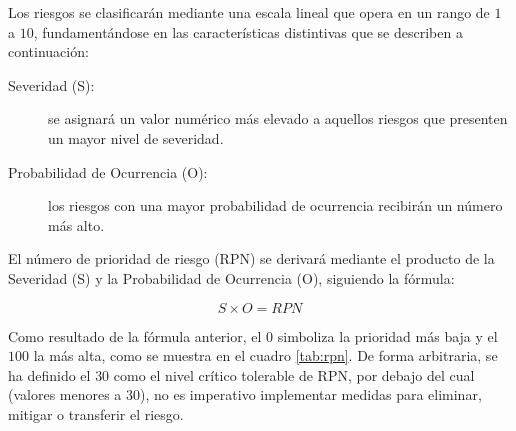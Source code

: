 

\newcommand{\colorcell}[1]{%
	\ifnum#1<10 \cellcolor{GreenColor}%
	\else\ifnum#1<20 \cellcolor{GreenColor!50}%
	\else\ifnum#1<30 \cellcolor{GreenColor!30}%
	\else\ifnum#1<40 \cellcolor{LightRed}%
	\else\ifnum#1<50 \cellcolor{RedColor!50}%
	\else\ifnum#1<60 \cellcolor{RedColor!60}%
	\else\ifnum#1<70 \cellcolor{RedColor!70}%
	\else\ifnum#1<80 \cellcolor{RedColor!80}%
	\else\ifnum#1<90 \cellcolor{RedColor!90}%
	\else \cellcolor{RedColor}%
	\fi\fi\fi\fi\fi\fi\fi\fi\fi
	#1%
}


Los riesgos se clasificarán mediante una escala lineal que opera en un rango de \(1\) a \(10\), fundamentándose en las características distintivas que se describen a continuación:

\begin{description}
	\item[Severidad (S):] se asignará un valor numérico más elevado a aquellos riesgos que presenten un mayor nivel de severidad.
	\item[Probabilidad de Ocurrencia (O):] los riesgos con una mayor probabilidad de ocurrencia recibirán un número más alto.
\end{description}

El número de prioridad de riesgo (RPN) se derivará mediante el producto de la Severidad (S) y la Probabilidad de Ocurrencia (O), siguiendo la fórmula:

\[ S \times O = RPN \]

Como resultado de la fórmula anterior, el \(0\) simboliza la prioridad más baja y el \(100\) la más alta, como se muestra en el cuadro \ref{tab:rpn}. De forma arbitraria, se ha definido el \(30\) como el nivel crítico tolerable de RPN, por debajo del cual (valores menores a 30), no es imperativo implementar medidas para eliminar, mitigar o transferir el riesgo.

